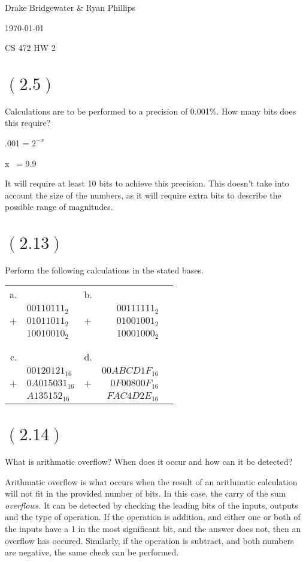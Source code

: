 \documentclass[letterpaper,12pt,titlepage]{article}
\def\name{Drake Bridgewater \& Ryan Phillips}
\begin{document}
\hfill \name

\hfill \today

\hfill CS 472 HW 2


\section*{$(2.5)$} Calculations are to be performed to a precision of 0.001\%. How many bits does this require?
  
.001 = $2^{-x}$

x ~= 9.9

It will require at least 10 bits to achieve this precision. This doesn't take into account the size of the numbers, as it will require extra bits to describe the possible range of magnitudes.

\section*{$(2.13)$} Perform the following calculations in the stated bases.

\begin{tabular}{r p{3cm} l r l}
a. 	&				& b. 	&					\\
	&	$00110111_{2}$ 		& 		& $00111111_{2}$   	\\
$+$ &	$01011011_{2}$ 		& $+$ 	& $01001001_{2}$	\\
\hline
	&	$10010010_{2}$ 		&  		& $10001000_{2}$	\\
 \\ \\
c. 	&				& d.	&					\\
	&	$00120121_{16}$		&  		& $00ABCD1F_{16}$ 	\\
$+$ &	$0A015031_{16}$ 	& $+$ 	& $0F00800F_{16}$ 	\\
\hline 
	&	$A135152_{16}$		&  		& $FAC4D2E_{16}$ 	\\
\end{tabular}


  
\section*{$(2.14)$} What is arithmatic overflow? When does it occur and how can it be detected?
  
Arithmatic overflow is what occurs when the result of an arithmatic calculation will not fit in the provided number of bits. In this case, the carry of the sum \textit{overflows}. It can be detected by checking the leading bits of the inputs, outputs and the type of operation. If the operation is addition, and either one or both of the inputs have a 1 in the most significant bit, and the answer does not, then an overflow has occured. Similarly, if the operation is subtract, and both numbers are negative, the same check can be performed.
\end{document}
